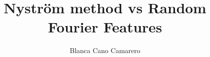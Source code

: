 \title{Nyström method vs Random Fourier Features}
\author{Blanca Cano Camarero}


\relax
{}\relax
{}\relax

\newcommand{\bgcolor}{blue}